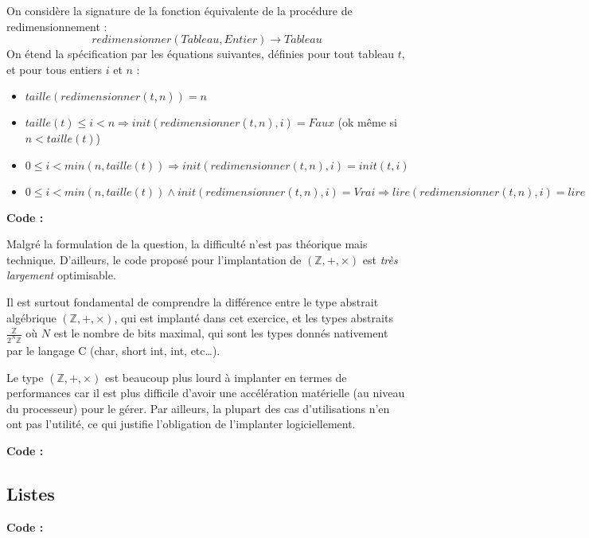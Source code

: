 \documentclass[../main.tex]{subfiles}
\begin{document}
On considère la signature de la fonction équivalente de la procédure de redimensionnement :
$$redimensionner(Tableau, Entier)\rightarrow Tableau$$
On étend la spécification par les équations suivantes, définies pour tout tableau $t$, et pour tous entiers $i$ et $n$ :
\begin{itemize}
	\item $taille(redimensionner(t, n)) = n$
	\item $taille(t)\leq i < n \Rightarrow init(redimensionner(t, n), i) = Faux$ (ok même si $n < taille(t)$)
	\item $0\leq i < min\left(n, taille(t)\right) \Rightarrow init(redimensionner(t, n), i) = init(t, i)$
	\item $0\leq i < min\left(n, taille(t)\right)\wedge init(redimensionner(t, n), i) = Vrai \Rightarrow lire(redimensionner(t, n), i) = lire(t, i)$
\end{itemize}
\textbf{Code :} 


Malgré la formulation de la question, la difficulté n'est pas théorique mais technique. D'ailleurs, le code proposé pour l'implantation de $(\mathbb{Z}, +, \times)$ est \textit{très largement} optimisable.

Il est surtout fondamental de comprendre la différence entre le type abstrait algébrique $(\mathbb{Z}, +, \times)$, qui est implanté dans cet exercice, et les types abstraits $\frac{\mathbb{Z}}{2^N\mathbb{Z}}$ où $N$ est le nombre de bits maximal, qui sont les types donnés nativement par le langage C (\textsf{char}, \textsf{short int}, \textsf{int}, etc\dots).

Le type $(\mathbb{Z}, +, \times)$ est beaucoup plus lourd à implanter en termes de performances car il est plus difficile d'avoir une accélération matérielle (au niveau du processeur) pour le gérer. Par ailleurs, la plupart des cas d'utilisations n'en ont pas l'utilité, ce qui justifie l'obligation de l'implanter logiciellement.

\textbf{Code :} 

\subsection{Listes}

\textbf{Code :} 
\end{document}
